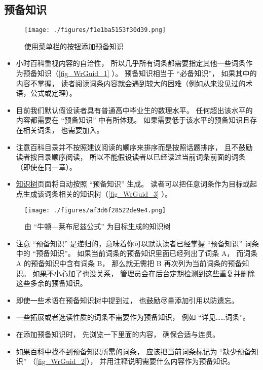 \subsection{预备知识}
\begin{figure}[ht]
\centering
\texttt{[image: ./figures/f1e1ba5153f30d39.png]}
\caption{使用菜单栏的按钮添加预备知识} \label{fig_WrGuid_1}
\end{figure}

\begin{itemize}
\item 小时百科重视内容的自洽性， 所以几乎所有词条都需要指定其他一些词条作为预备知识（\autoref{fig_WrGuid_1} ）。 预备知识相当于 “必备知识”， 如果其中的内容不掌握， 读者阅读词条内容就会遇到较大的困难（例如从来没见过的术语，公式或定理）。
\item 目前我们默认假设读者具有普通高中毕业生的数理水平。 任何超出该水平的内容都需要在 “预备知识” 中有所体现。 如果需要低于该水平的预备知识且存在相关词条， 也需要加入。
\item 注意百科目录并不按照建议阅读的顺序来排序而是按照话题排序， 且不鼓励读者按目录顺序阅读， 所以不能假设读者以已经读过当前词条前面的词条（即使在同一章）。
\item \href{https://wuli.wiki/tree/}{知识树}页面将自动按照 “预备知识” 生成。 读者可以把任意词条作为目标或起点生成该词条相关的知识树（\autoref{fig_WrGuid_3} ）。
\end{itemize}

\begin{figure}[ht]
\centering
\texttt{[image: ./figures/af3d6f28522de9e4.png]}
\caption{由 “牛顿—莱布尼兹公式” 为目标生成的知识树} \label{fig_WrGuid_3}
\end{figure}

\begin{itemize}
\item 注意 “预备知识” 是递归的，意味着你可以默认读者已经掌握 “预备知识” 词条中的 “预备知识”。 如果当前词条的预备知识里面已经列出了词条 A， 而词条 A 的预备知识中含有词条 B， 那么就无需把 B 再次列为当前词条的预备知识。 如果不小心加了也没关系， 管理员会在后台定期检测到这些重复并删除这些多余的预备知识。
\item 即使一些术语在预备知识树中提到过， 也鼓励尽量添加引用以防遗忘。
\item 一些拓展或者选读性质的词条不需要作为预备知识， 例如 “详见……词条”。
\item 在添加预备知识时， 先浏览一下里面的内容， 确保合适与连贯。
\item 如果百科中找不到预备知识所需的词条， 应该把当前词条标记为 “缺少预备知识” （\autoref{fig_WrGuid_2}）， 并用注释说明需要什么内容作为预备知识。
\end{itemize}

